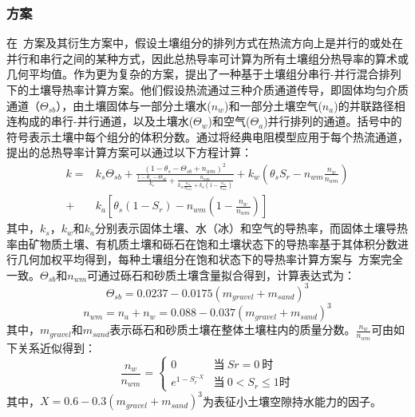 \subsubsection{\citet{tarnawski2012series}方案}
在~\citet{Johansen1975}方案及其衍生方案中，假设土壤组分的排列方式在热流方向上是并行的或处在并行和串行之间的某种方式，因此总热导率可计算为所有土壤组分热导率的算术或几何平均值。作为更为复杂的方案，\citet{tarnawski2012series}提出了一种基于土壤组分串行-并行混合排列下的土壤导热率计算方案。他们假设热流通过三种介质通道传导，即固体均匀介质通道（$\Theta_{sb}$），由土壤固体与一部分土壤水($n_w$)和一部分土壤空气($n_a$)的并联路径相连构成的串行-并行通道，以及土壤水($\Theta_w$)和空气($\Theta_a$)并行排列的通道。括号中的符号表示土壤中每个组分的体积分数。通过将经典电阻模型应用于每个热流通道，\citet{tarnawski2012series}提出的总热导率计算方案可以通过以下方程计算：
\begin{equation}
\begin{aligned}
k=&k_s\Theta_{sb}+\frac{(1-\theta_s-\Theta_{sb}+n_{wm})^2}{\frac{1-\theta_s-\Theta_{sb}}{k_s}+\frac{n_{wm}}{k_w\frac{n_w}{n_{wm}}+k_a\left(1-\frac{n_w}{n_{wm}}\right)}}+k_w\left(\theta_sS_r-n_{wm}\frac{n_w}{n_{wm}}\right) \\
+&k_a\left[\theta_s(1-S_r)-n_{wm}\left(1-\frac{n_w}{n_{wm}}\right)\right]
\end{aligned}
\end{equation}
其中，$k_s$，$k_w$和$k_a$分别表示固体土壤、水（冰）和空气的导热率，而固体土壤导热率由矿物质土壤、有机质土壤和砾石在饱和土壤状态下的导热率基于其体积分数进行几何加权平均得到，每种土壤组分在饱和状态下的导热率计算方案与~\citet{Johansen1975}方案完全一致。$\Theta_{sb}$和$n_{wm}$可通过砾石和砂质土壤含量拟合得到，计算表达式为：$$\Theta_{sb}=0.0237-0.0175\left(m_{gravel}+m_{sand}\right)^3$$$$n_{wm}=n_a+n_w=0.088-0.037\left(m_{gravel}+m_{sand}\right)^3$$
其中，$m_{gravel}$和$m_{sand}$表示砾石和砂质土壤在整体土壤柱内的质量分数。$\frac{n_w}{n_{wm}}$可由如下关系近似得到：
\begin{equation}
\frac{n_w}{n_{wm}}=\begin{cases}
0  & \text{当}\ Sr=0\ \text{时} \\ 
e^{1-S_r^{-X}} & \text{当}\ 0<S_r\leqslant1 \text{时}
\end{cases}
\end{equation}
其中，$X=0.6-0.3\left(m_{gravel}+m_{sand}\right)^3$为表征小土壤空隙持水能力的因子。

